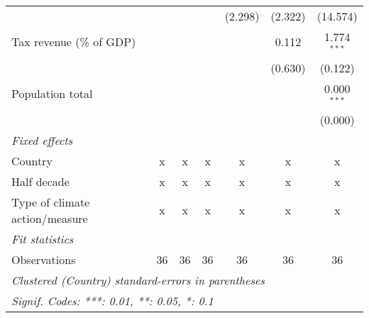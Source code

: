 \begin{tabular}{lcccccc}
                                                      &               &              &              & (2.298)      & (2.322)      & (14.574)\\   
   Tax revenue (\% of GDP)                            &               &              &              &              & 0.112        & 1.774$^{***}$\\   
                                                      &               &              &              &              & (0.630)      & (0.122)\\   
   Population total                                   &               &              &              &              &              & 0.000$^{***}$\\   
                                                      &               &              &              &              &              & (0.000)\\   
   \emph{Fixed effects}\\
   Country                                            & x             & x            & x            & x            & x            & x\\  
   Half decade                                        & x             & x            & x            & x            & x            & x\\  
   Type of climate action/measure                     & x             & x            & x            & x            & x            & x\\  
   \midrule \emph{Fit statistics}\\
   Observations                                       & 36            & 36           & 36           & 36           & 36           & 36\\  
   \midrule
   \multicolumn{7}{l}{\emph{Clustered (Country) standard-errors in parentheses}}\\
   \multicolumn{7}{l}{\emph{Signif. Codes: ***: 0.01, **: 0.05, *: 0.1}}\\
\end{tabular}
\par\endgroup


